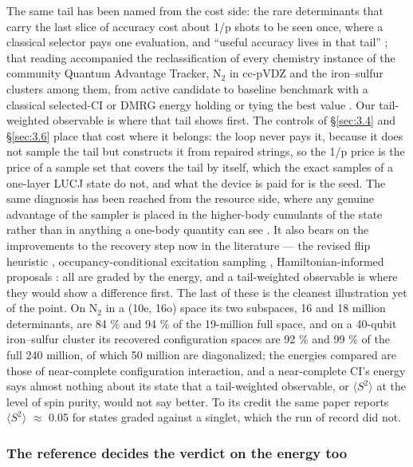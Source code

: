 \documentclass[11pt]{article}
\begin{document}
The same tail has been named from the cost side: the rare determinants that carry the last slice of accuracy cost about 1/p shots to be seen once, where a classical selector pays one evaluation, and ``useful accuracy lives in that tail'' \cite{Koyama2026}; that reading accompanied the reclassification of every chemistry instance of the community Quantum Advantage Tracker, N$_2$ in cc-pVDZ and the iron--sulfur clusters among them, from active candidate to baseline benchmark with a classical selected-CI or DMRG energy holding or tying the best value \cite{QATracker}. Our tail-weighted observable is where that tail shows first. The controls of \S\ref{sec:3.4} and \S\ref{sec:3.6} place that cost where it belongs: the loop never pays it, because it does not sample the tail but constructs it from repaired strings, so the 1/p price is the price of a sample set that covers the tail by itself, which the exact samples of a one-layer LUCJ state do not, and what the device is paid for is the seed. The same diagnosis has been reached from the resource side, where any genuine advantage of the sampler is placed in the higher-body cumulants of the state rather than in anything a one-body quantity can see \cite{Bonilla2026b}. It also bears on the improvements to the recovery step now in the literature --- the revised flip heuristic \cite{SQDaddon}, occupancy-conditional excitation sampling \cite{Weaving2025}, Hamiltonian-informed proposals \cite{AgarwalRay2026}: all are graded by the energy, and a tail-weighted observable is where they would show a difference first. The last of these is the cleanest illustration yet of the point. On N$_2$ in a (10e, 16o) space its two subspaces, 16 and 18 million determinants, are 84 \% and 94 \% of the 19-million full space, and on a 40-qubit iron--sulfur cluster its recovered configuration spaces are 92 \% and 99 \% of the full 240 million, of which 50 million are diagonalized; the energies compared are those of near-complete configuration interaction, and a near-complete CI's energy says almost nothing about its state that a tail-weighted observable, or $\langle S^{2}\rangle$ at the level of spin purity, would not say better. To its credit the same paper reports $\langle S^{2}\rangle$ $\approx$ 0.05 for states graded against a singlet, which the run of record did not.

\subsubsection{The reference decides the verdict on the energy too}\label{sec:3.7.4}
\end{document}
